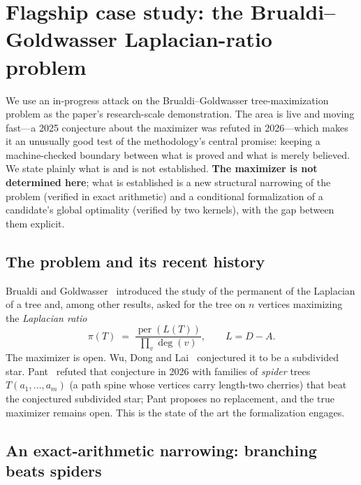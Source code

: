 \section{Flagship case study: the Brualdi--Goldwasser Laplacian-ratio problem}
\label{sec:bg}

We use an in-progress attack on the Brualdi--Goldwasser tree-maximization problem
as the paper's research-scale demonstration. The area is live and moving fast---a
2025 conjecture about the maximizer was refuted in 2026---which makes it an
unusually good test of the methodology's central promise: keeping a machine-checked
boundary between what is proved and what is merely believed. We state plainly what
is and is not established. \textbf{The maximizer is not determined here}; what is
established is a new structural narrowing of the problem (verified in exact
arithmetic) and a conditional formalization of a candidate's global optimality
(verified by two kernels), with the gap between them explicit.

\subsection{The problem and its recent history}

Brualdi and Goldwasser~\cite{brualdigoldwasser} introduced the study of the
permanent of the Laplacian of a tree and, among other results, asked for the tree
on $n$ vertices maximizing the \emph{Laplacian ratio}
\[
  \pi(T) \;=\; \frac{\operatorname{per}(L(T))}{\prod_{v} \deg(v)},
  \qquad L = D - A .
\]
The maximizer is open. Wu, Dong and Lai~\cite{wudonglai} conjectured it to be a
subdivided star. Pant~\cite{pant} refuted that conjecture in 2026 with families of
\emph{spider} trees $T(a_1,\dots,a_m)$ (a path spine whose vertices carry length-two
cherries) that beat the conjectured subdivided star; Pant proposes no replacement,
and the true maximizer remains open. This is the state of the art the formalization
engages.

\subsection{An exact-arithmetic narrowing: branching beats spiders}

